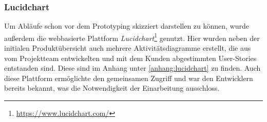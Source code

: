 \documentclass[10pt, a4paper]{article}
\begin{document}
\begin{onehalfspace}
      \subsubsection{Lucidchart}
      \label{Lucidchart}
      Um Abläufe schon vor dem Prototyping skizziert darstellen zu können, wurde außerdem die webbasierte Plattform \textit{Lucidchart}\footnote{\raggedright\url{https://www.lucidchart.com/}} genutzt.
      Hier wurden neben der initialen Produktübersicht auch mehrere Aktivitätsdiagramme erstellt, die aus vom Projektteam entwickelten und mit dem Kunden abgestimmten User-Stories entstanden sind.
      Diese sind im Anhang unter \autoref{anhang:lucidchart} zu finden.
      Auch diese Plattform ermöglichte den gemeinsamen Zugriff und war den Entwicklern bereits bekannt, was die Notwendigkeit der Einarbeitung ausschloss.


\end{onehalfspace}
\end{document}
